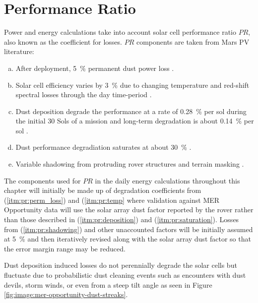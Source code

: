 \section{Performance Ratio}

Power and energy calculations take into account solar cell performance ratio $PR$, also known as the coefficient for losses. $PR$ components are taken from Mars PV literature:

\begin{enumerate}[(a)]
  \item\label{itm:pr:perm_loss}After deployment, \SI{5}{\percent} permanent dust power loss .
  \item\label{itm:pr:temp}Solar cell efficiency varies by \SI{3}{\percent} due to changing temperature and red-shift spectral losses through the day time-period .
  \item\label{itm:pr:deposition}Dust deposition degrade the performance at a rate of \SI{0.28}{\percent} per sol during the initial 30 Sols of a mission and long-term degradation is about \SI{0.14}{\percent} per sol .
  \item\label{itm:pr:saturation}Dust performance degradiation saturates at about \SI{30}{\percent} .
  \item\label{itm:pr:shadowing}Variable shadowing from protruding rover structures  and terrain masking .
\end{enumerate}

The components used for $PR$ in the daily energy calculations throughout this chapter will initially be made up of degradation coefficients from (\ref{itm:pr:perm_loss}) and
(\ref{itm:pr:temp} where validation against MER Opportunity data will use the solar array dust factor reported by the rover rather than those described in (\ref{itm:pr:deposition}) and (\ref{itm:pr:saturation}). Losses from (\ref{itm:pr:shadowing}) and other unaccounted factors will be initially assumed at \SI{5}{\percent} and then iteratively revised along with the solar array dust factor so that the error margin range may be reduced.

Dust deposition induced losses do not perennially degrade the solar cells but fluctuate due to probabilistic dust cleaning events such as encounters with dust devils, storm winds, or even from a steep tilt angle as seen in Figure \ref{fig:image:mer-opportunity-dust-streaks}.

